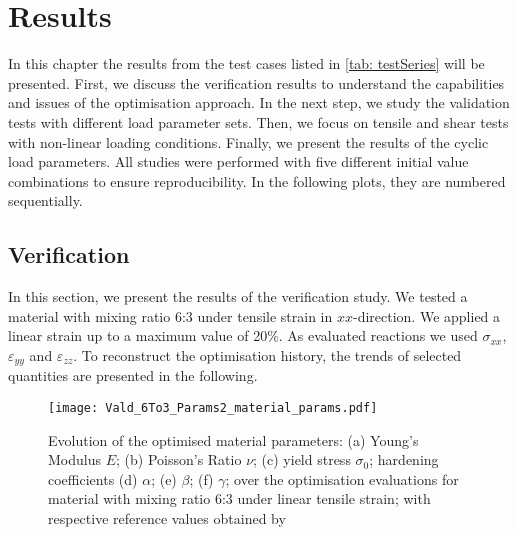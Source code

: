 \chapter{Results}\label{chap: results}

In this chapter the results from the test cases listed in \autoref{tab: testSeries} will be presented. First, we discuss the verification results to understand the capabilities and issues of the optimisation approach. In the next step, we study the validation tests with different load parameter sets. Then, we focus on tensile and shear tests with non-linear loading conditions. 
Finally, we present the results of the cyclic load parameters. All studies were performed with five different initial value combinations to ensure reproducibility. In the following plots, they are numbered sequentially. 

\section{Verification}\label{sec: verification}

In this section, we present the results of the verification study. We tested a material with mixing ratio 6:3 under tensile strain in $xx$-direction.
We applied a linear strain up to a maximum value of 20\%. As evaluated reactions we used $\sigma_{xx}$, $\varepsilon_{yy}$ and $\varepsilon_{zz}$. To reconstruct the optimisation history, the trends of selected quantities are presented in the following.

\begin{figure}[H]
    \centering
    \texttt{[image: Vald\_6To3\_Params2\_material\_params.pdf]}
    \caption{Evolution of the optimised material parameters: (a) Young's Modulus $E$; (b) Poisson's Ratio $\nu$; (c) yield stress $\sigma_0$; hardening coefficients (d) $\alpha$; (e) $\beta$; (f) $\gamma$; over the optimisation evaluations for material with mixing ratio 6:3 under linear tensile strain; with respective reference values obtained by \citet{ries_deciphering_nodate}}
    \label{fig:verifMaterialParams}
\end{figure}


